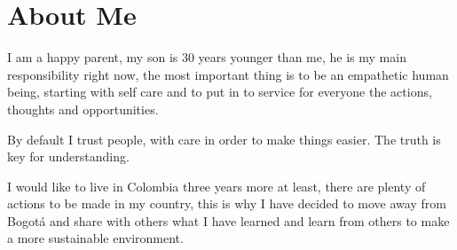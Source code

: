 \section{About Me}

I am a happy parent, my son is 30 years younger than me, he is
my main responsibility right now, the most important thing is
to be an empathetic human being, starting with self care and
to put in to service for everyone the actions, thoughts and
opportunities.

By default I trust people, with care in order to make things
easier.  The truth is key for understanding.

I would like to live in Colombia three years more
at least, there are plenty of actions to be made in my 
country, this is why I have decided to move away from Bogotá
and share with others what I have learned and learn from others
to make a more sustainable environment.
